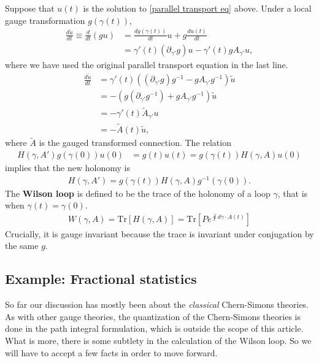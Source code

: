 \documentclass[aps,nofootinbib]{revtex4}
\newcommand\Tr{\mathrm{Tr}}
\begin{document}
Suppose that $u(t)$ is the solution to \eqref{parallel transport eq} above. Under a local gauge transformation $g(\gamma(t))$,
\begin{align*}
\frac{d\tilde{u}}{dt} \equiv \frac{d}{dt} (gu)  
	&= \frac{d g(\gamma(t))}{dt}u + g \frac{du(t)}{dt} \\
    &= \gamma'(t) (\partial_{\gamma'} g) u - \gamma'(t) g A_{\gamma'} u, 
\end{align*}
where we have used the original parallel transport equation in the last line.
\begin{align*}
\frac{d\tilde{u}}{dt} &= \gamma'(t) \left( (\partial_{\gamma'} g) g^{-1} - g A_{\gamma'} g^{-1} \right) \tilde{u} \\
	&= -\left( g (\partial_{\gamma'} g^{-1}) + g A_{\gamma'} g^{-1} \right) \tilde{u} \\
    &= -\gamma'(t) \tilde{A}_{\gamma'} u \\
    &= - \tilde{A}(t) \tilde{u},
\end{align*}
where $\tilde{A}$ is the gauged transformed connection. The relation
\begin{align*}
H(\gamma, A') g(\gamma(0)) u(0) &= g(t) u(t) = g(\gamma(t)) H(\gamma, A) u(0)
\end{align*}
implies that the new holonomy is
\begin{align}
\boxed{H(\gamma, A') = g(\gamma(t)) H(\gamma, A) g^{-1}(\gamma(0))}.
\end{align}
The {\bf Wilson loop} is defined to be the trace of the holonomy of a loop $\gamma$, that is when $\gamma(t)=\gamma(0)$.
\begin{align}
\boxed{W(\gamma,A) = \Tr [H(\gamma,A)] = \Tr \left[ Pe^{\oint d\gamma \cdot A(t)} \right]}
\end{align}
Crucially, it is gauge invariant because the trace is invariant under conjugation by the same $g$.

\subsection{Example: Fractional statistics}

So far our discussion has mostly been about the \emph{classical} Chern-Simons theories. As with other gauge theories, the quantization of the Chern-Simons theories is done in the path integral formulation, which is outside the scope of this article. What is more, there is some subtlety in the calculation of the Wilson loop. So we will have to accept a few facts in order to move forward.
\end{document}
